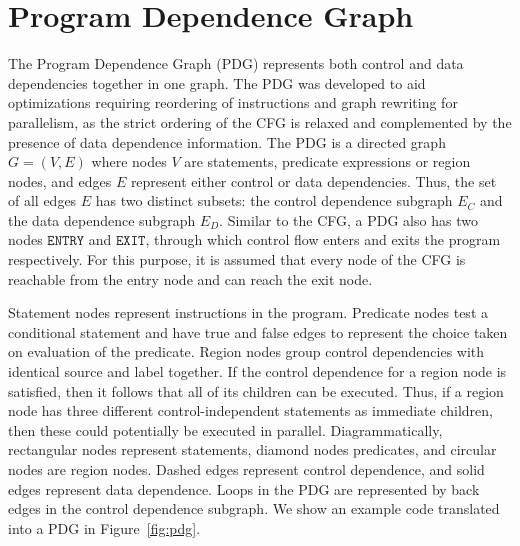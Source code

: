 \section{Program Dependence Graph}
\label{section:vsdg:pdg}

The Program Dependence Graph (PDG) represents both control and data dependencies together in one graph. The PDG was developed to aid optimizations requiring reordering of instructions and graph rewriting for parallelism, as the strict ordering of the CFG is relaxed and complemented by the presence of data dependence information. The PDG is a directed graph $G=(V,E)$ where nodes $V$ are statements, predicate expressions or region nodes, and edges $E$ represent either control or data dependencies. Thus, the set of all edges $E$ has two distinct subsets: the control dependence subgraph $E_{C}$ and the data dependence subgraph $E_{D}$. 
Similar to the CFG, a PDG also has two nodes $\texttt{ENTRY}$ and $\texttt{EXIT}$, through which control flow enters and exits the program respectively. For this purpose, it is assumed that every node of the CFG is reachable from the entry node and can reach the exit node.

Statement nodes represent instructions in the program. Predicate nodes test a conditional statement and have {\sf true}  and {\sf false} edges to represent the choice taken on evaluation of the predicate. Region nodes group control dependencies with identical source and label together. If the control dependence for a region node is satisfied, then it follows that all of its children can be executed. Thus, if a region node has three different control-independent statements as immediate children, then these could potentially be executed in parallel. Diagrammatically, rectangular nodes represent statements, diamond nodes predicates, and circular nodes are region nodes. Dashed edges represent control dependence, and solid edges represent data dependence. Loops in the PDG are represented by back edges in the control dependence subgraph. We show an example code translated into a PDG in Figure~\ref{fig:pdg}. 

